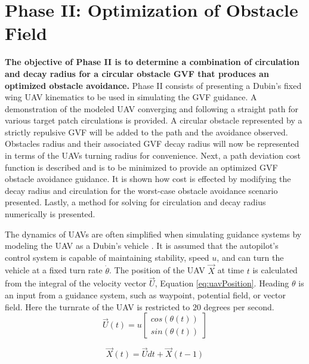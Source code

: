 \documentclass[numbered,pdftex]{ohio-etd}
\begin{document}
\pagebreak

\section{Phase II: Optimization of Obstacle Field}
\textbf{The objective of Phase II is to determine a combination of circulation and decay radius for a circular obstacle GVF that produces an optimized obstacle avoidance.} Phase II consists of presenting a Dubin's fixed wing UAV kinematics to be used in simulating the GVF guidance. 
A demonstration of the modeled UAV converging and following a straight path for various target patch circulations is provided. A circular obstacle represented by a strictly repulsive GVF will be added to the path and the avoidance observed. Obstacles radius and their associated GVF decay radius will now be represented in terms of the UAVs turning radius for convenience. Next, a path deviation cost function is described and is to be minimized to provide an optimized GVF obstacle avoidance guidance. It is shown how cost is effected by modifying the decay radius and circulation for the worst-case obstacle avoidance scenario presented. Lastly, a method for solving for circulation and decay radius numerically is presented. 


The dynamics of UAVs are often simplified when simulating guidance systems by modeling the UAV as a Dubin's vehicle \cite{frew_cooperative_2007,griffiths_vector_2006,nelson_cooperative_2005,nelson_vector_2006,nelson_vector_2007}. It is assumed that the autopilot's control system is capable of maintaining stability, speed $u$, and can turn the vehicle at a fixed turn rate $\dot{\theta}$. The position of the UAV $\overrightarrow{X}$ at time $t$ is calculated from the integral of the velocity vector $\overrightarrow{U}$, Equation \ref{eq:uavPosition}. Heading $\theta$ is an input from a guidance system, such as waypoint, potential field, or vector field. Here the turnrate of the UAV is restricted to $20$ degrees per second.
\begin{equation}
\label{eq:uavVelocity}
\overrightarrow{U}(t) = u \begin{bmatrix}
cos(\theta(t)) \\
sin(\theta(t))
\end{bmatrix}
\end{equation}


\begin{equation}
\label{eq:uavPosition}
\overrightarrow{X}(t) = \overrightarrow{U}dt + \overrightarrow{X}(t-1)
\end{equation}
\end{document}
